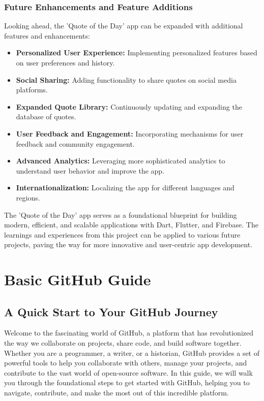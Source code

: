 \documentclass{book}
\begin{document}
\subsection{Future Enhancements and Feature Additions}
Looking ahead, the 'Quote of the Day' app can be expanded with additional features and enhancements:
\begin{itemize}
    \item \textbf{Personalized User Experience:} Implementing personalized features based on user preferences and history.
    \item \textbf{Social Sharing:} Adding functionality to share quotes on social media platforms.
    \item \textbf{Expanded Quote Library:} Continuously updating and expanding the database of quotes.
    \item \textbf{User Feedback and Engagement:} Incorporating mechanisms for user feedback and community engagement.
    \item \textbf{Advanced Analytics:} Leveraging more sophisticated analytics to understand user behavior and improve the app.
    \item \textbf{Internationalization:} Localizing the app for different languages and regions.
\end{itemize}

The 'Quote of the Day' app serves as a foundational blueprint for building modern, efficient, and scalable applications with Dart, Flutter, and Firebase. The learnings and experiences from this project can be applied to various future projects, paving the way for more innovative and user-centric app development.






\clearpage
{}
\appendix
\renewcommand{\thechapter}{\Roman{chapter}} %

\chapter{Basic GitHub Guide}
\section*{A Quick Start to Your GitHub Journey}

Welcome to the fascinating world of GitHub, a platform that has revolutionized the way we collaborate on projects, share code, and build software together. Whether you are a programmer, a writer, or a historian, GitHub provides a set of powerful tools to help you collaborate with others, manage your projects, and contribute to the vast world of open-source software. In this guide, we will walk you through the foundational steps to get started with GitHub, helping you to navigate, contribute, and make the most out of this incredible platform.
\end{document}
